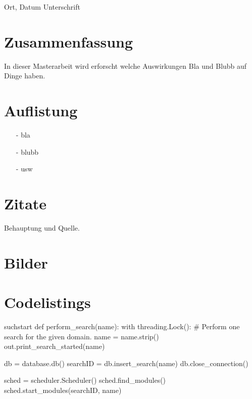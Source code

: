 Ort, Datum \hspace{5cm} Unterschrift

\chapter*{Zusammenfassung}

In dieser Masterarbeit wird erforscht welche Auswirkungen Bla und Blubb auf Dinge haben.

\listoftodos

\tableofcontents %


\chapter{Auflistung}


\begin{itemize}
	\item[-] bla
	\item[-] blubb
	\item[-] usw
\end{itemize}


\chapter{Zitate}
Behauptung und Quelle. \cite{google}

\chapter{Bilder}


\chapter{Codelistings}



\begin{python}{suchstart}
	def perform_search(name):
	with threading.Lock():
	# Perform one search for the given domain.
	name = name.strip()
	out.print_search_started(name)
	
	db = database.db()
	searchID = db.insert_search(name)
	db.close_connection()
	
	sched = scheduler.Scheduler()
	sched.find_modules()
	sched.start_modules(searchID, name)
\end{python}


